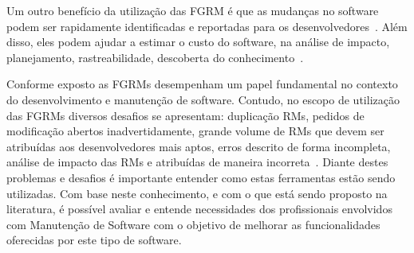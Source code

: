 Um outro benefício da utilização das FGRM é que as mudanças no
software podem ser rapidamente identificadas e reportadas para os
desenvolvedores~\cite{anvik2005coping}. Além disso, eles podem ajudar a estimar
o custo do software, na análise de impacto, planejamento, rastreabilidade,
descoberta do conhecimento~\cite{cavalcanti2013bug}.

Conforme exposto as FGRMs desempenham um papel fundamental no contexto do
desenvolvimento e manutenção de software. Contudo, no escopo de utilização das
FGRMs diversos desafios se apresentam: duplicação RMs, pedidos de modificação
abertos inadvertidamente, grande volume de RMs que devem ser atribuídas aos
desenvolvedores mais aptos, erros descrito de forma incompleta, análise de
impacto das RMs e atribuídas de maneira
incorreta~\cite{cavalcanti2014challenges}. Diante destes problemas e desafios é
importante entender como estas ferramentas estão sendo utilizadas. Com base
neste conhecimento, e com  o que está sendo proposto na literatura, é possível
avaliar e entende necessidades dos profissionais envolvidos com Manutenção de
Software com o objetivo de melhorar as funcionalidades oferecidas por este tipo
de software.

%
%
%
%

